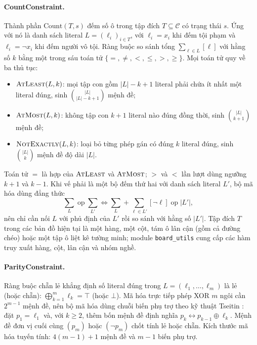 \paragraph{CountConstraint.}
Thành phần $\mathrm{Count}(T, s)$ đếm số ô trong tập đích
$T \subseteq \mathcal{C}$ có trạng thái $s$. Ứng với nó là danh sách literal
$L = (\ell_i)_{i \in T}$, với $\ell_i = x_i$ khi đếm tội phạm và
$\ell_i = \neg x_i$ khi đếm người vô tội. Ràng buộc so sánh tổng
$\sum_{\ell \in L} [\ell]$ với hằng số $k$ bằng một trong sáu toán tử
$\{=, \neq, <, \le, >, \ge\}$. Mọi toán tử quy về ba thủ tục:
\begin{itemize}
  \item $\textsc{AtLeast}(L, k)$: mọi tập con gồm $|L|-k+1$ literal phải chứa
    ít nhất một literal đúng, sinh $\binom{|L|}{|L|-k+1}$ mệnh đề;
  \item $\textsc{AtMost}(L, k)$: không tập con $k+1$ literal nào đúng đồng thời,
    sinh $\binom{|L|}{k+1}$ mệnh đề;
  \item $\textsc{NotExactly}(L, k)$: loại bỏ từng phép gán có đúng $k$ literal
    đúng, sinh $\binom{|L|}{k}$ mệnh đề độ dài $|L|$.
\end{itemize}
Toán tử $=$ là hợp của $\textsc{AtLeast}$ và $\textsc{AtMost}$; $>$ và $<$
lần lượt dùng ngưỡng $k+1$ và $k-1$. Khi vế phải là một bộ đếm thứ hai với
danh sách literal $L'$, bộ mã hóa dùng đẳng thức
\begin{equation}
  \textstyle\sum_{L} \;\mathrm{op}\; \sum_{L'}
  \iff
  \sum_{L} + \sum_{\ell \in L'} [\neg \ell] \;\mathrm{op}\; |L'| ,
\end{equation}
nên chỉ cần nối $L$ với phủ định của $L'$ rồi so sánh với hằng số $|L'|$.
Tập đích $T$ trong các bản đồ hiện tại là một hàng, một cột, tám ô lân cận
(gồm cả đường chéo) hoặc một tập ô liệt kê tường minh; module
\texttt{board\_utils} cung cấp các hàm truy xuất hàng, cột, lân cận và nhóm
nghề.

\paragraph{ParityConstraint.}
Ràng buộc chẵn lẻ khẳng định số literal đúng trong $L=(\ell_1,\ldots,\ell_m)$
là lẻ (hoặc chẵn): $\bigoplus_{k=1}^{m} \ell_k = \top$ (hoặc $\bot$). Mã hóa
trực tiếp phép XOR $m$ ngôi cần $2^{m-1}$ mệnh đề, nên bộ mã hóa dùng chuỗi
biến phụ trợ theo kỹ thuật Tseitin \cite{tseitin1968}: đặt $p_1 = \ell_1$ và,
với $k \ge 2$, thêm bốn mệnh đề định nghĩa
$p_k \leftrightarrow p_{k-1} \oplus \ell_k$. Mệnh đề đơn vị cuối cùng $(p_m)$
hoặc $(\neg p_m)$ chốt tính lẻ hoặc chẵn. Kích thước mã hóa tuyến tính:
$4(m-1)+1$ mệnh đề và $m-1$ biến phụ trợ.

